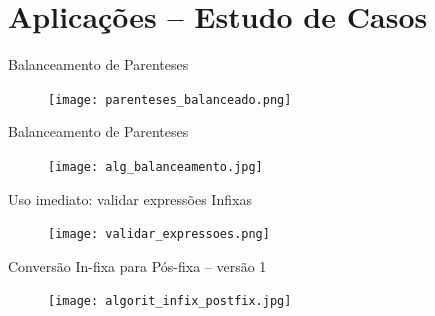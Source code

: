 %

\section{Aplicações -- Estudo de Casos}

\begin{frame}[c]{Balanceamento de Parenteses} 

		   	\begin{figure}[!htpb]
				\centering
				\texttt{[image: parenteses\_balanceado.png]}
			\end{figure} 
\end{frame}


\begin{frame}[c]{Balanceamento de Parenteses} 

		\begin{figure}[!htpb]
		\centering
		\texttt{[image: alg\_balanceamento.jpg]}
		\end{figure} 
\end{frame}


\begin{frame}[c]{Uso imediato: validar expressões Infixas} 

   	\begin{figure}[!htpb]
		\centering
		\texttt{[image: validar\_expressoes.png]}
		\end{figure} 
\end{frame}



\begin{frame}[c]{Conversão In-fixa para Pós-fixa -- versão 1} 

		   	\begin{figure}[!htpb]
				\centering
				\texttt{[image: algorit\_infix\_postfix.jpg]}
				\end{figure} 

\end{frame}

